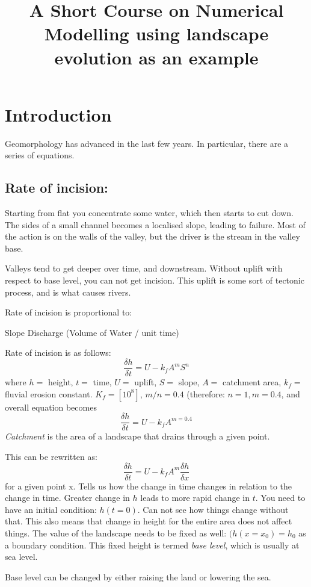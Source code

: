 


\title{A Short Course on Numerical Modelling using landscape evolution as an example}

\section{Introduction}
Geomorphology has advanced in the last few years. In particular, there are a series of equations.

\subsection{Rate of incision:}
Starting from flat you concentrate some water, which then starts to cut down. The sides of a small channel becomes a localised slope, leading to failure. Most of the action is on the walls of the valley, but the driver is the stream in the valley base.

Valleys tend to get deeper over time, and downstream. Without uplift with respect to base level, you can not get incision. This uplift is some sort of tectonic process, and is what causes rivers.

Rate of incision is proportional to:
\begin{enumerate}
\list Slope
\list Discharge (Volume of Water / unit time)
\end{enumerate}

Rate of incision is as follows:
\[
\frac{\delta h}{\delta t} = U-k_{f}A^{m}S^{n}
\]
where $h =$ height, $t =$ time, $U =$ uplift, $S =$ slope, $A =$ catchment area, $k_f =$ fluvial erosion constant. $K_f = [10^8]$, $m/n = 0.4$ (therefore: $n=1, m=0.4$, and overall equation becomes 
\[
\frac{\delta h}{\delta t} = U-k_{f}A^{m=0.4}
\]
\emph{Catchment} is the area of a landscape that drains through a given point.

This can be rewritten as:
\[
\frac{\delta h}{\delta t} = U-k_{f}A^{m} \frac{\delta h}{\delta x}
\]
for a given point x. Tells us how the change in time changes in relation to the change in time. Greater change in $h$ leads to more rapid change in $t$. You need to have an initial condition: $h( t = 0 )$. Can not see how things change without that. This also means that change in height for the entire area does not affect things. The value of the landscape needs to be fixed as well: $(h(x = x_0) = h_0$ as a boundary condition. This fixed height is termed \emph{base level}, which is usually at sea level.

Base level can be changed by either raising the land or lowering the sea.

